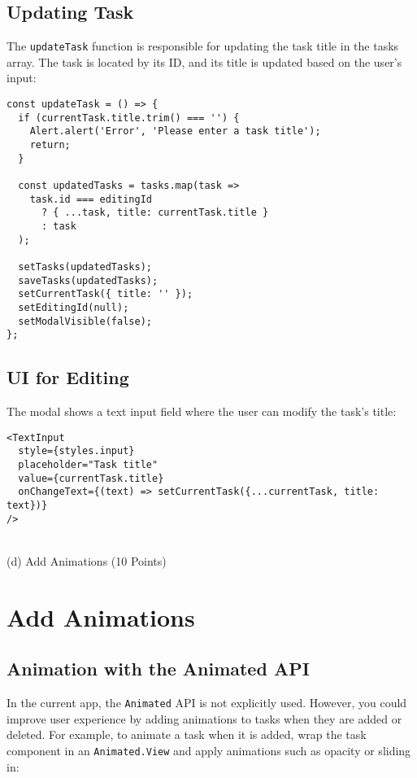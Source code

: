 \documentclass{article}
\begin{document}
\subsection*{Updating Task}

The \texttt{updateTask} function is responsible for updating the task title in the tasks array. The task is located by its ID, and its title is updated based on the user's input:

\begin{verbatim}
const updateTask = () => {
  if (currentTask.title.trim() === '') {
    Alert.alert('Error', 'Please enter a task title');
    return;
  }

  const updatedTasks = tasks.map(task =>
    task.id === editingId
      ? { ...task, title: currentTask.title }
      : task
  );

  setTasks(updatedTasks);
  saveTasks(updatedTasks);
  setCurrentTask({ title: '' });
  setEditingId(null);
  setModalVisible(false);
};
\end{verbatim}

\subsection*{UI for Editing}

The modal shows a text input field where the user can modify the task’s title:

\begin{verbatim}
<TextInput
  style={styles.input}
  placeholder="Task title"
  value={currentTask.title}
  onChangeText={(text) => setCurrentTask({...currentTask, title: text})}
/>
\end{verbatim}\\
\vspace{1cm}
(d) Add Animations (10 Points)
\section*{Add Animations}

\subsection*{Animation with the Animated API}

In the current app, the \texttt{Animated} API is not explicitly used. However, you could improve user experience by adding animations to tasks when they are added or deleted. For example, to animate a task when it is added, wrap the task component in an \texttt{Animated.View} and apply animations such as opacity or sliding in:
\end{document}
